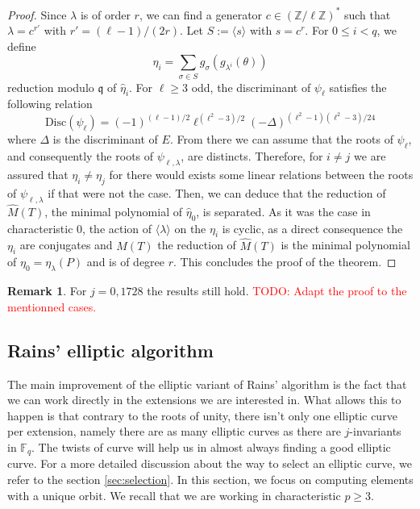 \documentclass[12pt]{article}
\theoremstyle{plain}
\theoremstyle{definition}
\newtheorem*{remark}{Remark}
\newcommand{\todo}[1]{\textcolor{red}{TODO: #1}}
\def\Z{\ensuremath{\mathbb{Z}}}
\def\F{\ensuremath{\mathbb{F}}}
\newcounter{algorithm}
\begin{document}
\begin{proof}
Since $\lambda$ is of order $r$, we can find a generator 
$c\in(\Z/\ell\Z)^{\ast}$ such that $\lambda = c^{r'}$ with 
$r'=(\ell-1)/(2r)$. Let $S:=\langle{s}\rangle$ with $s=c^r$. For $0\leq i<q$, 
we define 
\begin{equation}
\eta_i = \sum_{\sigma\in S}{g_{\sigma}(g_{\lambda^i}(\theta))}
\end{equation}
reduction modulo $\mathfrak{q}$ of $\widehat{\eta}_i$. For $\ell\geq3$ odd, the
discriminant of $\psi_\ell$ satisfies the following relation \cite{MiMoScho}
\begin{equation}
\text{Disc}(\psi_\ell)=
(-1)^{(\ell-1)/2}\ell^{(\ell^2-3)/2}(-\Delta)^{(\ell^2-1)(\ell^2-3)/24}
\end{equation}
where $\Delta$ is the discriminant of $E$. From there we can assume that the
roots of $\psi_\ell$, and consequently the roots of $\psi_{\ell,\lambda}$, are
distincts. Therefore, for $i\neq j$ we are assured that $\eta_i\neq\eta_j$ for
there would exists some linear relations between the roots of
$\psi_{\ell,\lambda}$ if that were not the case. Then, we can deduce that the 
reduction of $\widehat{M}(T)$, the minimal polynomial of $\widehat{\eta}_0$, 
is separated. As it was the case in characteristic $0$, the action of 
$\langle{\lambda}\rangle$ on the $\eta_i$ is cyclic, as a direct consequence 
the $\eta_i$ are conjugates and $M(T)$ the reduction of $\widehat{M}(T)$ is 
the minimal polynomial of $\eta_0 = \eta_\lambda(P)$ and is of degree $r$. 
This concludes the proof of the theorem.
\end{proof}

\begin{remark}
For $j=0,1728$ the results still hold. \todo{Adapt the proof to the mentionned
cases.}
\end{remark}

\subsection{Rains' elliptic algorithm}

The main improvement of the elliptic variant of Rains' algorithm is the fact
that we can work directly in the extensions we are interested in. What allows
this to happen is that contrary to the roots of unity, there isn't only one
elliptic curve per extension, namely there are as many elliptic curves as there
are $j$-invariants in $\F_q$. The twists of curve will help us in 
almost always finding a good elliptic curve. For a more detailed discussion 
about the way to select an elliptic curve, we refer to the section 
\ref{sec:selection}. In this section, we focus on computing elements with a 
unique orbit. We recall that we are working in characteristic $p\geq3$.
\end{document}
